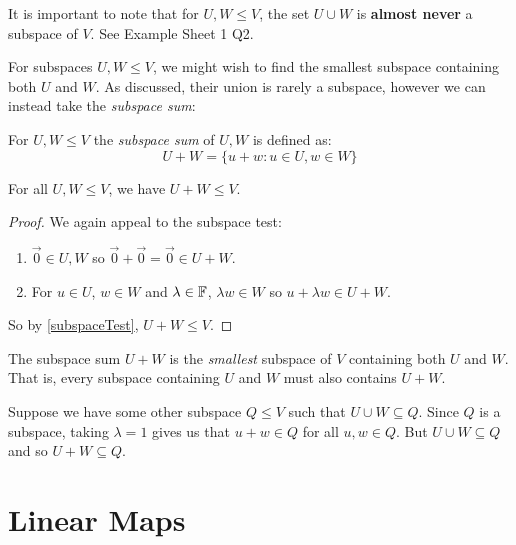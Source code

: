 \documentclass[../main.tex]{subfiles}
\begin{document}
\begin{remark}[Warning]
  It is important to note that for $U, W \leq V$, the set $U \cup W$ is \textbf{almost never} a subspace of $V$.
  See Example Sheet 1 Q2.
\end{remark}
For subspaces $U, W \leq V$, we might wish to find the smallest subspace containing both $U$ and $W$.
As discussed, their union is rarely a subspace, however we can instead take the \textit{subspace sum}:
\begin{definition}
  For $U, W \leq V$ the \textit{subspace sum} of $U, W$ is defined as:
  \[
    U + W = \{u + w: u \in U, w \in W\}
  \]
\end{definition}
\begin{lemma}
  For all $U, W \leq V$, we have $U + W \leq V$.
\end{lemma}
\begin{proof}
  We again appeal to the subspace test:
  \begin{enumerate}
    \item $\vec{0} \in U, W$ so $\vec{0} + \vec{0} = \vec{0} \in U + W$.
    \item For $u \in U$, $w \in W$ and $\lambda \in \mathbb{F}$, $\lambda w \in W$ so $u + \lambda w \in U + W$.
  \end{enumerate}
  So by \cref{subspaceTest}, $U + W \leq V$.
\end{proof}
\begin{remark}[Remarks]
  The subspace sum $U + W$ is the \textit{smallest} subspace of $V$ containing both $U$ and $W$.
  That is, every subspace containing $U$ and $W$ must also contains $U + W$.

  Suppose we have some other subspace $Q \leq V$ such that $U \cup W \subseteq Q$.
  Since $Q$ is a subspace, taking $\lambda = 1$ gives us that $u + w \in Q$ for all $u, w \in Q$.
  But $U \cup W \subseteq Q$ and so $U + W \subseteq Q$.
\end{remark}
\section{Linear Maps}
\end{document}
